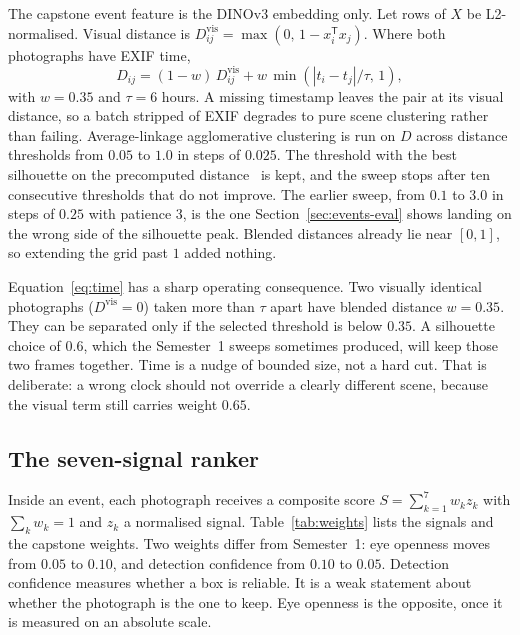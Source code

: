 \documentclass[conference]{IEEEtran}
\begin{document}
The capstone event feature is the \mbox{DINOv3} embedding only. Let rows of $X$ be
L2-normalised. Visual distance is $D^{\mathrm{vis}}_{ij}=\max(0,\,1-x_i^{\mathsf T}x_j)$.
Where both photographs have EXIF time,
\begin{equation}
D_{ij}
=
(1-w)\,D^{\mathrm{vis}}_{ij}
+
w\,\min\!\left(|t_i-t_j|/\tau,\,1\right),
\label{eq:time}
\end{equation}
with $w=0.35$ and $\tau=6$ hours. A missing timestamp leaves the pair at its
visual distance, so a batch stripped of EXIF degrades to pure scene clustering
rather than failing. Average-linkage agglomerative clustering is run on $D$
across distance thresholds from $0.05$ to $1.0$ in steps of $0.025$. The
threshold with the best silhouette on the precomputed
distance~\cite{rousseeuw1987silhouettes} is kept, and the sweep stops after
ten consecutive thresholds that do not improve. The earlier sweep, from $0.1$
to $3.0$ in steps of $0.25$ with patience $3$, is the one Section~\ref{sec:events-eval}
shows landing on the wrong side of the silhouette peak. Blended distances
already lie near $[0,1]$, so extending the grid past $1$ added nothing.

Equation~\eqref{eq:time} has a sharp operating consequence. Two visually
identical photographs ($D^{\mathrm{vis}}=0$) taken more than $\tau$ apart have
blended distance $w=0.35$. They can be separated only if the selected threshold
is below $0.35$. A silhouette choice of $0.6$, which the Semester~1 sweeps
sometimes produced, will keep those two frames together. Time is a nudge of
bounded size, not a hard cut. That is deliberate: a wrong clock should not
override a clearly different scene, because the visual term still carries
weight $0.65$.


\subsection{The seven-signal ranker}
\label{sec:rank}

Inside an event, each photograph receives a composite score
$S=\sum_{k=1}^{7} w_k z_k$ with $\sum_k w_k=1$ and $z_k$ a normalised signal.
Table~\ref{tab:weights} lists the signals and the capstone weights. Two weights
differ from Semester~1: eye openness moves from $0.05$ to $0.10$, and detection
confidence from $0.10$ to $0.05$. Detection confidence measures whether a box
is reliable. It is a weak statement about whether the photograph is the one to
keep. Eye openness is the opposite, once it is measured on an absolute scale.
\end{document}

